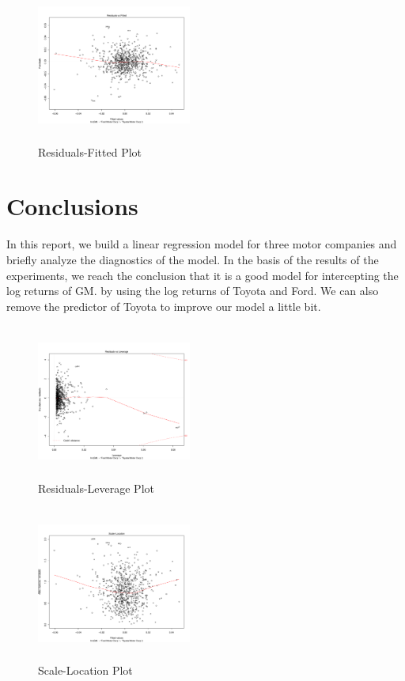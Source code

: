 \begin{figure}[h!]
\includegraphics[height=2in, width=2in]{residuals-fitted}
\caption{Residuals-Fitted Plot}
\label{img:rfplot}
\end{figure}

\section{Conclusions}
In this report, we build a linear regression model for three motor companies and briefly analyze the diagnostics of the model. In the basis of the results of the experiments, we reach the conclusion that it is a good model for intercepting the log returns of GM. by using the log returns of Toyota and Ford. We can also remove the predictor of Toyota to improve our model a little bit. 



\begin{figure}[h!]
\includegraphics[height=2in, width=2in]{residuals-leverage}
\caption{Residuals-Leverage Plot}
\label{img:rlplot}
\end{figure}

\begin{figure}[h!]
\includegraphics[height=2in, width=2in]{scale-location}
\caption{Scale-Location Plot}
\label{img:slplot}
\end{figure}
